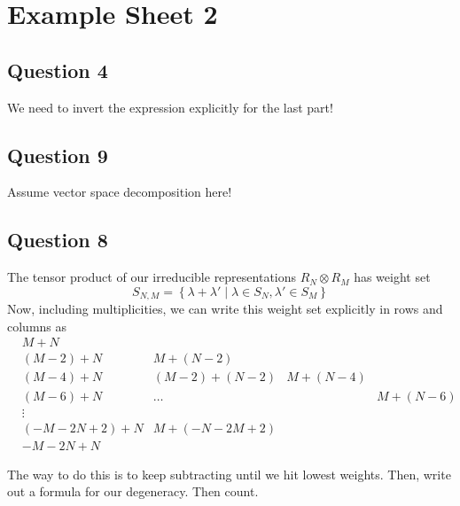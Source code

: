 \section{Example Sheet 2} 


\subsection{Question 4} 
We need to invert the expression explicitly for the last part!


\subsection{Question 9} 
Assume vector space decomposition here!


\subsection{Question 8} 
The tensor product of our irreducible representations $ R _ N \otimes R _M$
has weight set 
\[
 S_{ N , M } = \left\{  \lambda + \lambda ' \mid \lambda \in 
 S _ N , \lambda ' \in S _ M \right\} 
\] Now, including multiplicities, we can write this weight set 
explicitly in rows and columns as 
\begin{align*}
	& M + N & & & \\
	& (M - 2 ) + N & M + ( N - 2) & & \\
	& (M - 4 ) + N & ( M - 2 ) + ( N - 2 ) & M + ( N - 4 ) & \\
	& (M - 6 ) + N & \dots & & M + ( N - 6 ) \\
	& \vdots & & & \\
	& ( -M - 2N + 2) + N   &  M + (  - N - 2M  + 2)  & & \\
	& - M - 2N  + N & & & 
\end{align*}

The way to do this is to keep subtracting until 
we hit lowest weights. 
Then, write out a formula for our degeneracy. 
Then count. 

